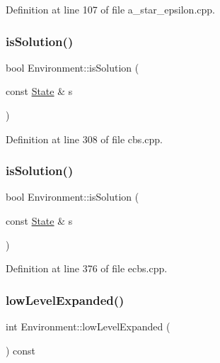 Definition at line 107 of file a\+\_\+star\+\_\+epsilon.\+cpp.

\mbox{\label{class_environment_aab14c04c6aaaf6b0d0f26f8b92d44400}} 
\subsubsection{\texorpdfstring{is\+Solution()}{isSolution()}\hspace{0.1cm}{\footnotesize\ttfamily [3/4]}}
{\footnotesize\ttfamily bool Environment\+::is\+Solution (\begin{DoxyParamCaption}\item[{const \hyperlink{struct_state}{State} \&}]{s }\end{DoxyParamCaption})\hspace{0.3cm}{\ttfamily [inline]}}



Definition at line 308 of file cbs.\+cpp.

\mbox{\label{class_environment_aab14c04c6aaaf6b0d0f26f8b92d44400}} 
\subsubsection{\texorpdfstring{is\+Solution()}{isSolution()}\hspace{0.1cm}{\footnotesize\ttfamily [4/4]}}
{\footnotesize\ttfamily bool Environment\+::is\+Solution (\begin{DoxyParamCaption}\item[{const \hyperlink{struct_state}{State} \&}]{s }\end{DoxyParamCaption})\hspace{0.3cm}{\ttfamily [inline]}}



Definition at line 376 of file ecbs.\+cpp.

\mbox{\label{class_environment_af870f6d7c69f7401f5d724b0ee60308f}} 
\subsubsection{\texorpdfstring{low\+Level\+Expanded()}{lowLevelExpanded()}\hspace{0.1cm}{\footnotesize\ttfamily [1/2]}}
{\footnotesize\ttfamily int Environment\+::low\+Level\+Expanded (\begin{DoxyParamCaption}{ }\end{DoxyParamCaption}) const\hspace{0.3cm}{\ttfamily [inline]}}



